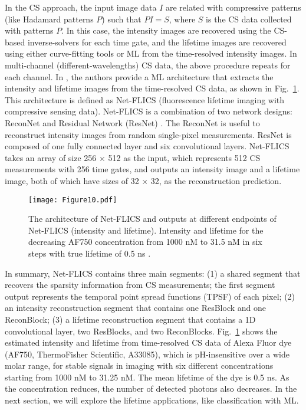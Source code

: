 \documentclass[12pt]{iopart}
\begin{document}
In the CS approach, the input image data $I$ are related with compressive patterns (like Hadamard patterns $P$) such that $PI = S$, where $S$ is the CS data collected with patterns $P$. In this case, the intensity images are recovered using the CS-based inverse-solvers for each time gate, and the lifetime images are recovered using either curve-fitting tools or ML from the time-resolved intensity images. In multi-channel (different-wavelengths) CS data, the above procedure repeats for each channel. In \cite{netflics1}, the authors provide a ML architecture that extracts the intensity and lifetime images from the time-resolved CS data, as shown in Fig.~\ref{fig2_netflics1}. This architecture is defined as Net-FLICS (fluorescence lifetime imaging with compressive sensing data). Net-FLICS is a combination of two network designs: ReconNet \cite{reconnet} and Residual Network (ResNet) \cite{resnet}. The ReconNet is useful to reconstruct intensity images from random single-pixel measurements. ResNet is composed of one fully connected layer and six convolutional layers. Net-FLICS takes an array of size 256 $\times$ 512 as the input, which represents 512 CS measurements with 256 time gates, and outputs an intensity image and a lifetime image, both of which have sizes of 32 $\times$ 32, as the reconstruction prediction.  

\begin{figure}[!t]
\centering
\texttt{[image: Figure10.pdf]}
\caption{The architecture of Net-FLICS and outputs at different endpoints of Net-FLICS (intensity and lifetime). Intensity and lifetime for the decreasing AF750 concentration from 1000 nM to 31.5 nM in six steps with true lifetime of 0.5 ns \cite{netflics1}.}\label{fig2_netflics1}
\end{figure}

In summary, Net-FLICS contains three main segments: (1) a shared segment that recovers the sparsity information from CS measurements; the first segment output represents the temporal point spread functions (TPSF) of each pixel; (2) an intensity reconstruction segment that contains one ResBlock and one ReconBlock; (3) a lifetime reconstruction segment that contains a 1D convolutional layer, two ResBlocks, and two ReconBlocks. Fig.~\ref{fig2_netflics1} shows the estimated intensity and lifetime from time-resolved CS data of Alexa Fluor dye (AF750, ThermoFisher Scientific, A33085), which is pH-insensitive over a wide molar range, for stable signals in imaging with six different concentrations starting from 1000 nM to 31.25 nM. The mean lifetime of the dye is 0.5 ns. As the concentration reduces, the number of detected photons also decreases. In the next section, we will explore the lifetime applications, like classification with ML.
\end{document}
